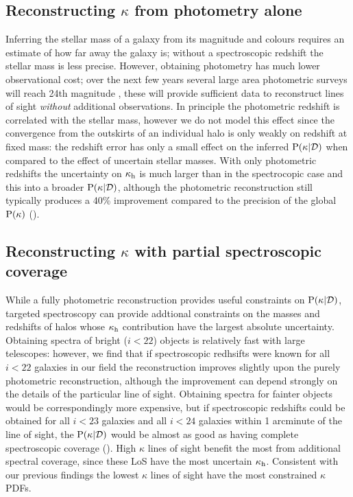 \documentclass[useAMS,usenatbib]{mn2e}
\begin{document}
%

\subsection{Reconstructing $\kappa$ from photometry alone}

Inferring the stellar mass of a galaxy from its magnitude and colours requires
an estimate of how far away the galaxy is; without a spectroscopic redshift
the \infered stellar mass is less precise. However, obtaining photometry has
much lower observational cost; over the next few years several large area
photometric surveys will reach 24th magnitude \citep{Euclid,LSST}, these will
provide sufficient data to reconstruct lines of sight {\it without} additional
observations. In principle the photometric redshift is correlated with the
\infered stellar mass, however we do not model this effect since the
convergence from the outskirts of an individual halo is only weakly \dependant
on redshift at fixed mass: the redshift error has only a small effect on the
inferred ${\rm P}(\kappa|{\mathcal{D}})$ when compared to the effect of uncertain stellar
masses.  With only photometric redshifts the uncertainty on
$\kappa_{\rm h}$ is much larger than in the spectrocopic case and this
\propogates into a broader ${\rm P}(\kappa|{\mathcal{D}})$, although the photometric
reconstruction still typically produces a 40\% improvement compared to the
precision of the global ${\rm P}(\kappa)$ ().


\subsection{Reconstructing $\kappa$ with partial spectroscopic coverage}

While a fully photometric reconstruction provides useful constraints on
${\rm P}(\kappa|{\mathcal{D}})$, targeted spectroscopy can provide addtional constraints
on the masses and redshifts of halos whose $\kappa_{\rm h}$ contribution have the
largest absolute uncertainty. Obtaining spectra of bright ($i<22$) objects is
relatively fast with large telescopes: however, we find that if spectroscopic
redhsifts were known for all $i<22$ galaxies in our field the reconstruction
improves slightly upon the purely photometric reconstruction, although the
improvement can depend strongly on the details of the particular line of
sight. Obtaining spectra for fainter objects would be correspondingly more
expensive, but if spectroscopic redshifts could be obtained for all $i<23$
galaxies and all $i<24$ galaxies within 1 arcminute of the line of sight, the
${\rm P}(\kappa|{\mathcal{D}})$ would be almost as good as having complete spectroscopic
coverage (). High $\kappa$ lines of sight benefit the
most from additional spectral coverage, since these LoS have the most
uncertain $\kappa_{\rm h}$. Consistent with our previous findings the lowest $\kappa$
lines of sight have the most constrained $\kappa$ PDFs.
\end{document}
